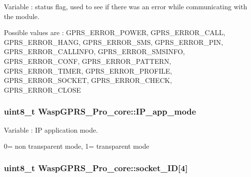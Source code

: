 Variable \+: status flag, used to see if there was an error while communicating with the module. 

Possible values are \+: G\+P\+R\+S\+\_\+\+E\+R\+R\+O\+R\+\_\+\+P\+O\+W\+ER, G\+P\+R\+S\+\_\+\+E\+R\+R\+O\+R\+\_\+\+C\+A\+LL, G\+P\+R\+S\+\_\+\+E\+R\+R\+O\+R\+\_\+\+H\+A\+NG, G\+P\+R\+S\+\_\+\+E\+R\+R\+O\+R\+\_\+\+S\+MS, G\+P\+R\+S\+\_\+\+E\+R\+R\+O\+R\+\_\+\+P\+IN, G\+P\+R\+S\+\_\+\+E\+R\+R\+O\+R\+\_\+\+C\+A\+L\+L\+I\+N\+FO, G\+P\+R\+S\+\_\+\+E\+R\+R\+O\+R\+\_\+\+S\+M\+S\+I\+N\+FO, G\+P\+R\+S\+\_\+\+E\+R\+R\+O\+R\+\_\+\+C\+O\+NF, G\+P\+R\+S\+\_\+\+E\+R\+R\+O\+R\+\_\+\+P\+A\+T\+T\+E\+RN, G\+P\+R\+S\+\_\+\+E\+R\+R\+O\+R\+\_\+\+T\+I\+M\+ER, G\+P\+R\+S\+\_\+\+E\+R\+R\+O\+R\+\_\+\+P\+R\+O\+F\+I\+LE, G\+P\+R\+S\+\_\+\+E\+R\+R\+O\+R\+\_\+\+S\+O\+C\+K\+ET, G\+P\+R\+S\+\_\+\+E\+R\+R\+O\+R\+\_\+\+C\+H\+E\+CK, G\+P\+R\+S\+\_\+\+E\+R\+R\+O\+R\+\_\+\+C\+L\+O\+SE 
\subsubsection[{\texorpdfstring{I\+P\+\_\+app\+\_\+mode}{IP_app_mode}}]{\setlength{\rightskip}{0pt plus 5cm}uint8\+\_\+t Wasp\+G\+P\+R\+S\+\_\+\+Pro\+\_\+core\+::\+I\+P\+\_\+app\+\_\+mode}\hypertarget{class_wasp_g_p_r_s___pro__core_a0e35adb0246e794e218f05af6dcca9b8}{}\label{class_wasp_g_p_r_s___pro__core_a0e35adb0246e794e218f05af6dcca9b8}


Variable \+: IP application mode. 

\textquotesingle{}0\textquotesingle{}= non transparent mode, \textquotesingle{}1\textquotesingle{}= transparent mode 
\subsubsection[{\texorpdfstring{socket\+\_\+\+ID}{socket_ID}}]{\setlength{\rightskip}{0pt plus 5cm}uint8\+\_\+t Wasp\+G\+P\+R\+S\+\_\+\+Pro\+\_\+core\+::socket\+\_\+\+ID\mbox{[}4\mbox{]}}\hypertarget{class_wasp_g_p_r_s___pro__core_a3afa2569c7057708bcb718c5d14adec5}{}\label{class_wasp_g_p_r_s___pro__core_a3afa2569c7057708bcb718c5d14adec5}


